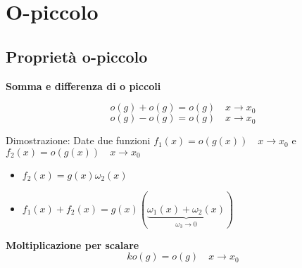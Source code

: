 \section{O-piccolo}
\subsection{Proprietà o-piccolo}
\textbf{Somma e differenza di o piccoli}

\[
o\left( g \right) + o\left( g \right)  = o \left( g \right) \quad x \to x_0
\] 
\[
o\left( g \right) - o\left( g \right) = o\left( g \right) \quad x \to x_0
\] 

Dimostrazione:
\vskip3mm
Date due funzioni $f_1\left( x \right)  = o\left( g\left( x \right)  \right) \quad x \to x_0$ e $f_2\left( x \right) = o\left( g\left( x \right)  \right) \quad x \to x_0$
\begin{itemize}
	\item $f_2\left( x \right) = g\left( x \right) \omega_2 \left( x \right) $
	\item $f_1\left( x \right) + f_2\left( x \right) = g\left( x \right) \left( \underbrace{\omega_1\left( x \right) + \omega_2\left( x \right) }_{\omega_3 \to 0} \right) $
\end{itemize}

\textbf{Moltiplicazione per scalare}
\[
k o\left( g \right) = o\left( g \right)  \quad  x \to x_0
\] 

